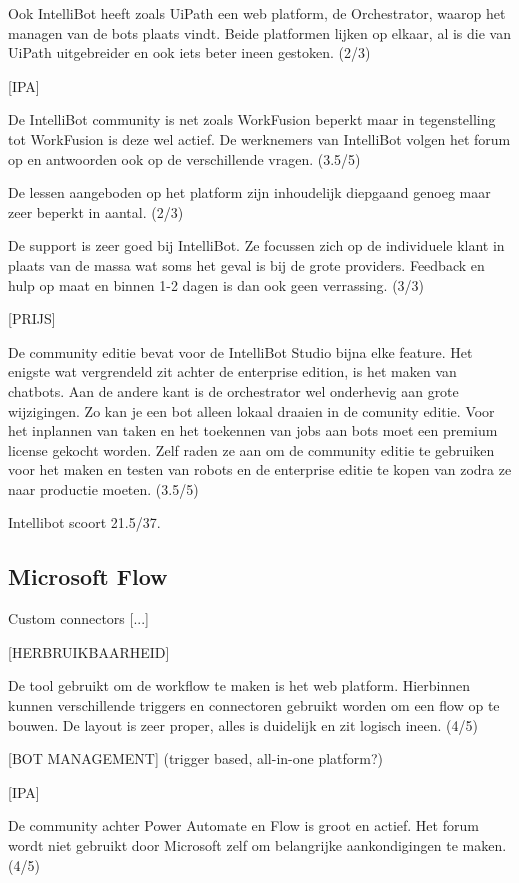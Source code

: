 Ook IntelliBot heeft zoals UiPath een web platform, de Orchestrator, waarop het managen van de bots plaats vindt. Beide platformen lijken op elkaar, al is die van UiPath uitgebreider en ook iets beter ineen gestoken. (2/3)

[IPA]

De IntelliBot community is net zoals WorkFusion beperkt maar in tegenstelling tot WorkFusion is deze wel actief. De werknemers van IntelliBot volgen het forum op en antwoorden ook op de verschillende vragen. (3.5/5)

De lessen aangeboden op het platform zijn inhoudelijk diepgaand genoeg maar zeer beperkt in aantal. (2/3)

De support is zeer goed bij IntelliBot. Ze focussen zich op de individuele klant in plaats van de massa wat soms het geval is bij de grote providers. Feedback en hulp op maat en binnen 1-2 dagen is dan ook geen verrassing. (3/3)

[PRIJS]

De community editie bevat voor de IntelliBot Studio bijna elke feature. Het enigste wat vergrendeld zit achter de enterprise edition, is het maken van chatbots. Aan de andere kant is de orchestrator wel onderhevig aan grote wijzigingen. Zo kan je een bot alleen lokaal draaien in de comunity editie. Voor het inplannen van taken en het toekennen van jobs aan bots moet een premium license gekocht worden. Zelf raden ze aan om de community editie te gebruiken voor het maken en testen van robots en de enterprise editie te kopen van zodra ze naar productie moeten. (3.5/5) 

Intellibot scoort 21.5/37.

\subsection{Microsoft Flow}

Custom connectors [...]

[HERBRUIKBAARHEID]

De tool gebruikt om de workflow te maken is het web platform. Hierbinnen kunnen verschillende triggers en connectoren gebruikt worden om een flow op te bouwen. De layout is zeer proper, alles is duidelijk en zit logisch ineen. (4/5)

[BOT MANAGEMENT] (trigger based, all-in-one platform?)

[IPA]

De community achter Power Automate en Flow is groot en actief. Het forum wordt niet gebruikt door Microsoft zelf om belangrijke aankondigingen te maken. (4/5)

